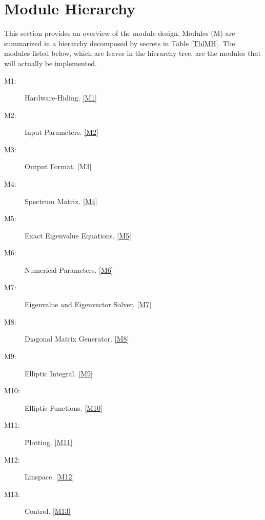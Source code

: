 \documentclass[12pt, titlepage]{article}
\begin{document}
	\section{Module Hierarchy} \label{SecMH}
	
	This section provides an overview of the module design. Modules (M) are 
	summarized
	in a hierarchy decomposed by secrets in Table \ref{TblMH}. The modules 
	listed
	below, which are leaves in the hierarchy tree, are the modules that will
	actually be implemented.
	\begin{description}
		\item[M1:] Hardware-Hiding. \ref{M1} \\
		\item[M2:] Input Parameters. \ref{M2} \\
		\item[M3:] Output Format. \ref{M3} \\
		\item[M4:] Spectrum Matrix. \ref{M4} \\
		\item[M5:] Exact Eigenvalue Equations. \ref{M5} \\
		\item[M6:] Numerical Parameters. \ref{M6} \\
		\item[M7:] Eigenvalue and Eigenvector Solver. \ref{M7} \\
		\item[M8:] Diagonal Matrix Generator. \ref{M8} \\
		\item[M9:] Elliptic Integral.  \ref{M9} \\
		\item[M10:] Elliptic Functions.  \ref{M10} \\
		\item[M11:] Plotting.  \ref{M11} \\
		\item[M12:] Linspace.  \ref{M12} \\
		\item[M13:] Control.  \ref{M13} \\
	\end{description}
	
\end{document}

